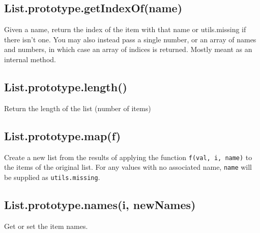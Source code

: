 \documentclass{article}
\begin{document}
    \subsection*{List.prototype.getIndexOf(name)}
    Given a name, return the index of the item with that name
or utils.missing if there isn't one.
You may also instead pass a single number, or an array of names
and numbers, in which case an array of indices is returned.
Mostly meant as an internal method.


    \subsection*{List.prototype.length()}
    Return the length of the list (number of items)


    \subsection*{List.prototype.map(f)}
    Create a new list from the results of applying the function \texttt{f(val, i, name)}
to the items of the original list. For any values with no associated name,
\texttt{name} will be supplied as \texttt{utils.missing}.


    \subsection*{List.prototype.names(i, newNames)}
    Get or set the item names.
\end{document}
